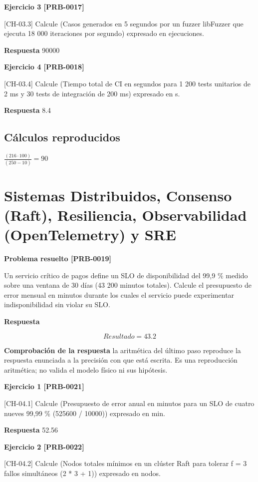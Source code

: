 \documentclass{book}
\begin{document}
\noindent\textbf{Ejercicio 3 [PRB-0017]}

[CH-03.3] Calcule (Casos generados en 5 segundos por un fuzzer libFuzzer que ejecuta 18 000 iteraciones por segundo) expresado en ejecuciones.

\noindent\textbf{Respuesta} 90000

\noindent\textbf{Ejercicio 4 [PRB-0018]}

[CH-03.4] Calcule (Tiempo total de CI en segundos para 1 200 tests unitarios de 2 ms y 30 tests de integración de 200 ms) expresado en s.

\noindent\textbf{Respuesta} 8.4

\subsection*{Cálculos reproducidos}

\(\frac{\left(216\cdot 100\right)}{\left(250-10\right)} = 90\)

\section{Sistemas Distribuidos, Consenso (Raft), Resiliencia, Observabilidad (OpenTelemetry) y SRE}

\noindent\textbf{Problema resuelto [PRB-0019]}

Un servicio crítico de pagos define un SLO de disponibilidad del 99,9 \% medido sobre una ventana de 30 días (43 200 minutos totales). Calcule el presupuesto de error mensual en minutos durante los cuales el servicio puede experimentar indisponibilidad sin violar su SLO.

\noindent\textbf{Respuesta}

\[
Resultado = 43.2
\]

\noindent\textbf{Comprobación de la respuesta} la aritmética del último paso reproduce la respuesta enunciada a la precisión con que está escrita. Es una reproducción aritmética; no valida el modelo físico ni sus hipótesis.

\noindent\textbf{Ejercicio 1 [PRB-0021]}

[CH-04.1] Calcule (Presupuesto de error anual en minutos para un SLO de cuatro nueves 99,99 \% (525600 / 10000)) expresado en min.

\noindent\textbf{Respuesta} 52.56

\noindent\textbf{Ejercicio 2 [PRB-0022]}

[CH-04.2] Calcule (Nodos totales mínimos en un clúster Raft para tolerar f = 3 fallos simultáneos (2 * 3 + 1)) expresado en nodos.
\end{document}

